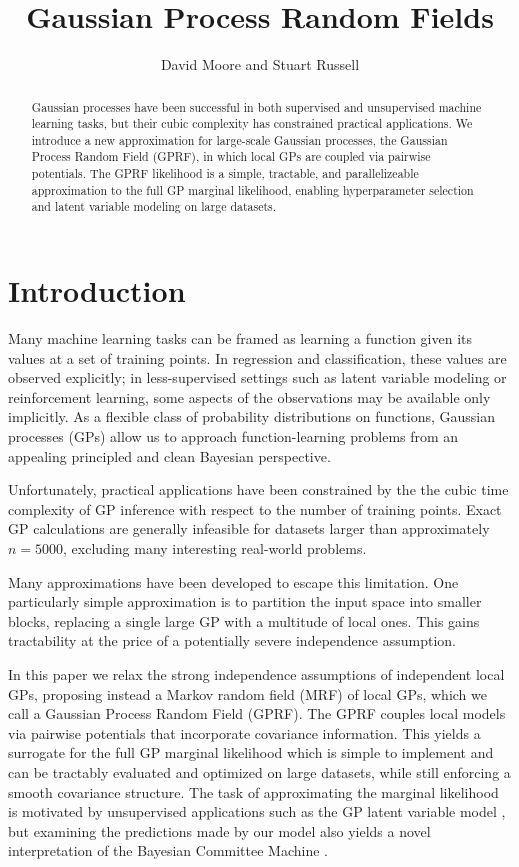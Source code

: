 \documentclass{article}
\begin{document}
\title{Gaussian Process Random Fields}
\author{David Moore and Stuart Russell}
\maketitle

\begin{abstract}
Gaussian processes have been successful in both supervised and
unsupervised machine learning tasks, but their cubic complexity has
constrained practical applications. We introduce a new approximation
for large-scale Gaussian processes, the Gaussian Process Random Field (GPRF),
in which local GPs are coupled via pairwise potentials. The GPRF
likelihood is a simple, tractable, and parallelizeable approximation to the full GP marginal
likelihood, enabling hyperparameter selection and latent variable
modeling on large datasets.
\end{abstract}

\section{Introduction}

Many machine learning tasks can be framed as learning a function
given its values at a set of training points. In regression and
classification, these values are observed explicitly; in less-supervised
settings such as latent variable modeling or reinforcement learning,
some aspects of the observations may be available only implicitly. As
a flexible class of probability distributions on functions,  Gaussian
processes (GPs) allow us to approach function-learning problems from
an appealing principled and clean Bayesian perspective.

Unfortunately, practical applications have been constrained by the the cubic time complexity of GP inference with respect
to the number of training points. Exact GP calculations are generally
infeasible for datasets larger than approximately $n=5000$, excluding
many interesting real-world problems. 

Many approximations have been
developed to escape this limitation. One particularly simple approximation is to partition the
input space into smaller blocks, replacing a single large GP with a
multitude of local ones. This gains tractability at the
price of a potentially severe independence assumption. 

In this paper we relax the strong independence assumptions of
independent local GPs, proposing instead a Markov random field (MRF) of
local GPs, which we call a Gaussian Process Random Field (GPRF). The
GPRF couples local models via pairwise potentials that incorporate
covariance information. This yields a surrogate for the full GP
marginal likelihood which is simple to implement and 
can be tractably evaluated and optimized on
large datasets, while still enforcing a smooth covariance
structure. The task of approximating the marginal likelihood is
motivated by unsupervised applications such as the GP latent variable
model \cite{lawrence2004gaussian}, but examining the predictions made by our model also
yields a novel interpretation of the Bayesian Committee Machine \cite{tresp2000bayesian}.
\end{document}
